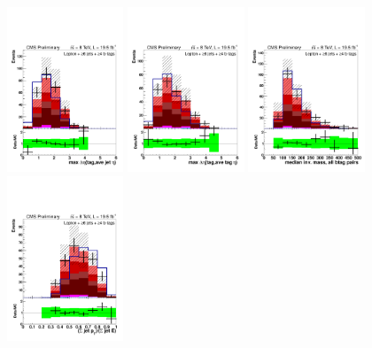 \begin{figure}[hbtp]
\begin{center}
   \includegraphics[width=0.31\textwidth]{Figures/Analysis_2_Diagrams/LJ_plots_lep/6j4t/lep_maxeta_jet_tag_6j4t_cumulative_wRatio_noLegend_lin.pdf}
   \includegraphics[width=0.31\textwidth]{Figures/Analysis_2_Diagrams/LJ_plots_lep/6j4t/lep_maxeta_tag_tag_6j4t_cumulative_wRatio_noLegend_lin.pdf}
   \includegraphics[width=0.31\textwidth]{Figures/Analysis_2_Diagrams/LJ_plots_lep/6j4t/lep_median_bb_mass_6j4t_cumulative_wRatio_noLegend_lin.pdf}
   \includegraphics[width=0.31\textwidth]{Figures/Analysis_2_Diagrams/LJ_plots_lep/6j4t/lep_pt_all_jets_over_E_all_jets_6j4t_cumulative_wRatio_noLegend_lin.pdf}

\end{center}
\end{figure}
